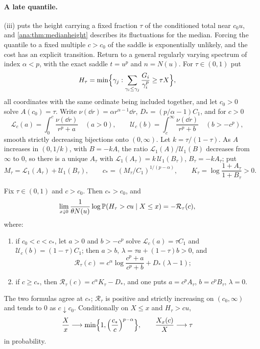 \paragraph{A late quantile.} (iii) puts the height carrying a fixed fraction $\tau$ of
the conditioned total near $c_0u$, and \cref{ana:thm:medianheight} describes its fluctuations for the
median. Forcing the quantile to a fixed multiple $c>c_0$ of the saddle is exponentially unlikely, and
the cost has an explicit transition. Return to a general regularly varying spectrum of index $\alpha<p$,
with the exact saddle $t=u^p$ and $n=N(u)$. For $\tau\in(0,1)$ put
\[
 H_\tau=\min\Bigl\{\gamma_j:\sum_{\gamma_i\le\gamma_j}\frac{G_i}{\gamma_i^p}\ge\tau X\Bigr\},
\]
all coordinates with the same ordinate being included together, and let $c_0>0$ solve $A(c_0)=\tau$. Write
$\nu(\dd r)=\alpha r^{\alpha-1}\dd r$, $D_*=(p/\alpha-1)C_1$, and for $c>0$
\[
 \mathcal L_c(a)=\int_0^c\frac{\nu(\dd r)}{r^p+a}\quad(a>0),\qquad\mathcal U_c(b)=\int_c^\infty\frac{\nu(\dd r)}{r^p+b}\quad(b>-c^p),
\]
smooth strictly decreasing bijections onto $(0,\infty)$. Let $k=\tau/(1-\tau)$. As $A$ increases in $(0,1/k)$, with
$B=-kA$, the ratio $\mathcal L_1(A)/\mathcal U_1(B)$ decreases from $\infty$ to $0$, so there is a unique $A_\tau$ with
$\mathcal L_1(A_\tau)=k\,\mathcal U_1(B_\tau)$, $B_\tau=-kA_\tau$; put
\[
 M_\tau=\mathcal L_1(A_\tau)+\mathcal U_1(B_\tau),\qquad c_*=(M_\tau/C_1)^{1/(p-\alpha)},\qquad K_\tau=\log\frac{1+A_\tau}{1+B_\tau}>0.
\]

\begin{theorem}\label{lih:thm:quantile}
Fix $\tau\in(0,1)$ and $c>c_0$. Then $c_*>c_0$, and
\[
 \lim_{x\downarrow0}\frac1{\theta N(u)}\log\mathbb{P}(H_\tau>cu\mid X\le x)=-\mathcal R_\tau(c),
\]
where:
\begin{enumerate}[label=\textup{(\roman*)}]
\item if $c_0<c<c_*$, let $a>0$ and $b>-c^p$ solve $\mathcal L_c(a)=\tau C_1$ and $\mathcal U_c(b)=(1-\tau)C_1$; then $a>b$,
$\lambda=\tau a+(1-\tau)b>0$, and
\[
 \mathcal R_\tau(c)=c^\alpha\log\frac{c^p+a}{c^p+b}+D_*(\lambda-1);
\]
\item if $c\ge c_*$, then $\mathcal R_\tau(c)=c^\alpha K_\tau-D_*$, and one puts $a=c^pA_\tau$, $b=c^pB_\tau$, $\lambda=0$.
\end{enumerate}
The two formulas agree at $c_*$; $\mathcal R_\tau$ is positive and strictly increasing on $(c_0,\infty)$ and tends to $0$
as $c\downarrow c_0$. Conditionally on $X\le x$ and $H_\tau>cu$,
\[
 \frac Xx\longrightarrow\min\Bigl\{1,\Bigl(\frac{c_*}c\Bigr)^{p-\alpha}\Bigr\},\qquad\frac{X_x(c)}X\longrightarrow\tau
\]
in probability.
\end{theorem}

